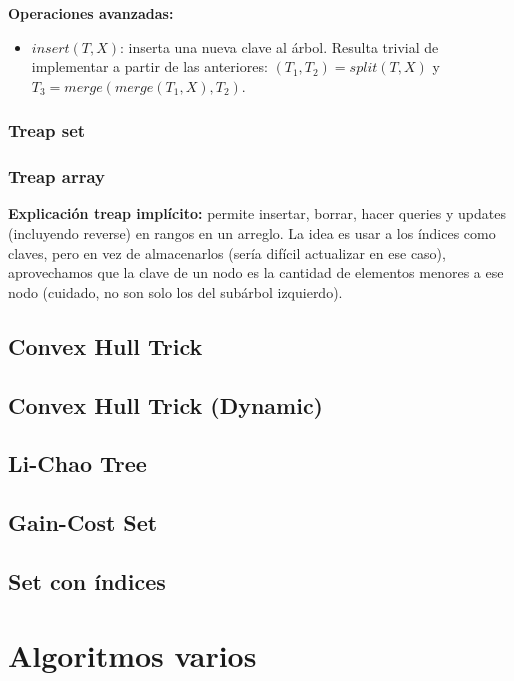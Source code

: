 \textbf{Operaciones avanzadas:}
\begin{itemize}
	\item $insert(T, X)$: inserta una nueva clave al árbol. Resulta trivial de implementar a partir de las anteriores:
	$(T_1, T_2) = split(T, X)$ y $T_3 = merge(merge(T_1, X), T_2)$.
\end{itemize}
\subsubsection{Treap set}
\subsubsection{Treap array}
\textbf{Explicación treap implícito:} permite insertar, borrar, hacer queries y updates (incluyendo reverse) en rangos
en un arreglo. La idea es usar a los índices como claves, pero en vez de almacenarlos (sería difícil actualizar en ese caso),
aprovechamos que la clave de un nodo es la cantidad de elementos menores a ese nodo (cuidado, no son solo los del
subárbol izquierdo).

\subsection{Convex Hull Trick}
\subsection{Convex Hull Trick (Dynamic)}
\subsection{Li-Chao Tree}
\subsection{Gain-Cost Set}
\subsection{Set con índices}


\section{Algoritmos varios}%
